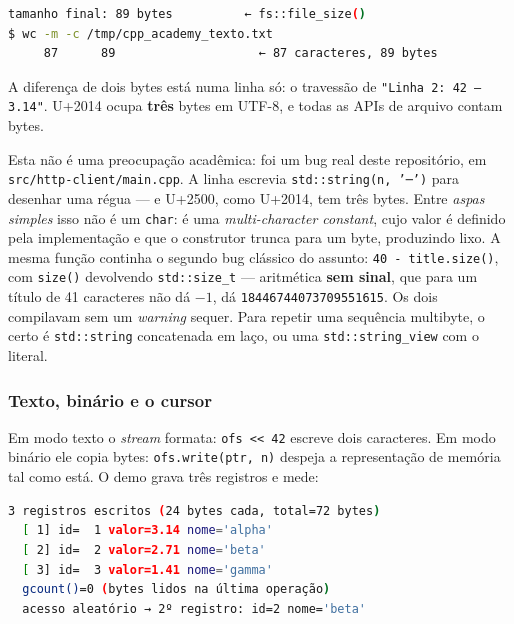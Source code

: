 \begin{lstlisting}[style=bt, language=bash,
    caption={\texttt{dist/bin/file\_io}, demo 2, seção 1, confrontado com
             \texttt{wc}.}]
  tamanho final: 89 bytes          ← fs::file_size()
$ wc -m -c /tmp/cpp_academy_texto.txt
     87      89                    ← 87 caracteres, 89 bytes
\end{lstlisting}

A diferença de dois bytes está numa linha só: o travessão de
\texttt{"Linha 2: 42 --- 3.14"}. U+2014 ocupa \textbf{três} bytes em UTF-8, e
todas as APIs de arquivo contam bytes.

\begin{armadilha}
Esta não é uma preocupação acadêmica: foi um bug real deste repositório, em
\texttt{src/http-client/main.cpp}. A linha escrevia
\texttt{std::string(n, '─')} para desenhar uma régua --- e U+2500, como U+2014,
tem três bytes. Entre \emph{aspas simples} isso não é um \texttt{char}: é uma
\emph{multi-character constant}, cujo valor é definido pela implementação e que
o construtor trunca para um byte, produzindo lixo. A mesma função continha o
segundo bug clássico do assunto: \texttt{40 - title.size()}, com
\texttt{size()} devolvendo \texttt{std::size\_t} --- aritmética \textbf{sem
sinal}, que para um título de 41 caracteres não dá $-1$, dá
\texttt{18446744073709551615}. Os dois compilavam sem um \emph{warning} sequer.
Para repetir uma sequência multibyte, o certo é
\texttt{std::string} concatenada em laço, ou uma \texttt{std::string\_view}
com o literal.
\end{armadilha}

\subsubsection{Texto, binário e o cursor}

Em modo texto o \emph{stream} formata: \texttt{ofs << 42} escreve dois
caracteres. Em modo binário ele copia bytes: \texttt{ofs.write(ptr, n)} despeja
a representação de memória tal como está. O demo grava três registros e mede:

\begin{lstlisting}[style=bt, language=bash,
    caption={\texttt{dist/bin/file\_io}, demo 2, seção 4.}]
  3 registros escritos (24 bytes cada, total=72 bytes)
  [ 1] id=  1 valor=3.14 nome='alpha'
  [ 2] id=  2 valor=2.71 nome='beta'
  [ 3] id=  3 valor=1.41 nome='gamma'
  gcount()=0 (bytes lidos na última operação)
  acesso aleatório → 2º registro: id=2 nome='beta'
\end{lstlisting}

